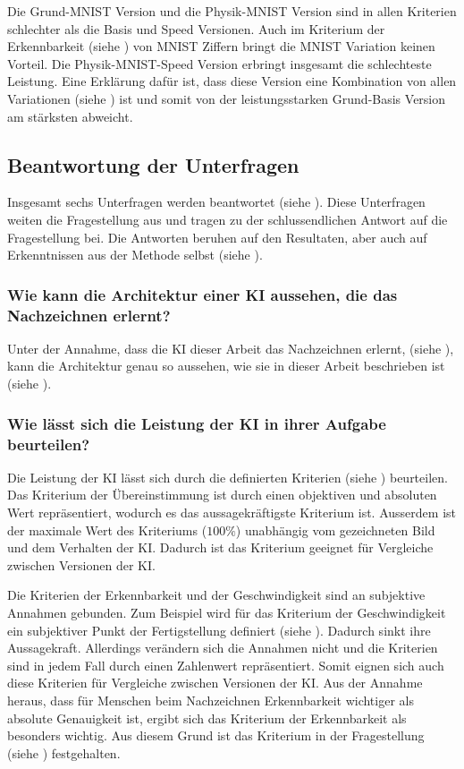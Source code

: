 Die Grund-MNIST Version und die Physik-MNIST Version sind in allen Kriterien
schlechter als die Basis und Speed Versionen. Auch im Kriterium der
Erkennbarkeit (siehe ) von MNIST Ziffern bringt die
MNIST Variation keinen Vorteil. Die Physik-MNIST-Speed Version erbringt
insgesamt die schlechteste Leistung. Eine Erklärung dafür ist, dass diese
Version eine Kombination von allen Variationen (siehe )
ist und somit von der leistungsstarken Grund-Basis Version am stärksten
abweicht.
 
 
\subsection{Beantwortung der Unterfragen}\label{sub:d_frage_unter}
Insgesamt sechs Unterfragen werden beantwortet (siehe ).
Diese Unterfragen weiten die Fragestellung aus und tragen zu der
schlussendlichen Antwort auf die Fragestellung bei. Die Antworten beruhen auf
den Resultaten, aber auch auf Erkenntnissen aus der Methode selbst (siehe
).
 
\subsubsection*{Wie kann die Architektur einer KI aussehen, die das Nachzeichnen erlernt?}\label{subsub:d_frage_unter_1}
Unter der Annahme, dass die KI dieser Arbeit das Nachzeichnen erlernt, (siehe
), kann die Architektur genau so aussehen, wie sie in
dieser Arbeit beschrieben ist (siehe ).
 
\subsubsection*{Wie lässt sich die Leistung der KI in ihrer Aufgabe
beurteilen?}\label{subsub:d_frage_unter_2} Die Leistung der KI lässt sich durch
die definierten Kriterien (siehe ) beurteilen. Das
Kriterium der Übereinstimmung ist durch einen objektiven und absoluten Wert
repräsentiert, wodurch es das aussagekräftigste Kriterium ist. Ausserdem ist der
maximale Wert des Kriteriums ($100\%$) unabhängig vom gezeichneten Bild und dem
Verhalten der KI. Dadurch ist das Kriterium geeignet für Vergleiche zwischen
Versionen der KI.
 
Die Kriterien der Erkennbarkeit und der Geschwindigkeit sind an subjektive
Annahmen gebunden. Zum Beispiel wird für das Kriterium der Geschwindigkeit ein
subjektiver Punkt der Fertigstellung definiert (siehe
). Dadurch sinkt ihre Aussagekraft. Allerdings
verändern sich die Annahmen nicht und die Kriterien sind in jedem Fall durch
einen Zahlenwert repräsentiert. Somit eignen sich auch diese Kriterien für
Vergleiche zwischen Versionen der KI. Aus der Annahme heraus, dass für Menschen
beim Nachzeichnen Erkennbarkeit wichtiger als absolute Genauigkeit ist, ergibt
sich das Kriterium der Erkennbarkeit als besonders wichtig. Aus diesem Grund
ist das Kriterium in der Fragestellung (siehe )
festgehalten.
 
